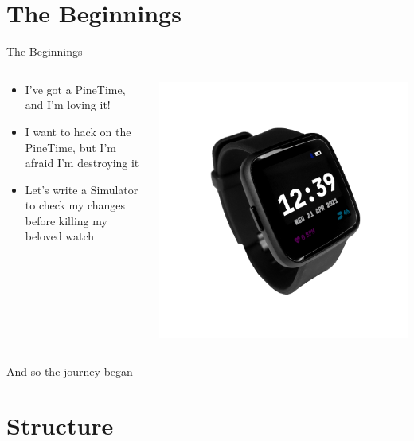 \documentclass{beamer}
\begin{document}
\section{The Beginnings}
\begin{frame}{The Beginnings}
  \begin{columns}
  \begin{column}{0.6\textwidth}
    \begin{itemize}
      \item I've got a PineTime, and I'm loving it!
      \item I want to hack on the PineTime, but I'm afraid I'm destroying it
      \item Let's write a Simulator to check my changes before killing my beloved watch
    \end{itemize}
  \end{column}
  \begin{column}{0.5\textwidth}
    \includegraphics[width=\textwidth]{../pinetime-slider-v2}
  \end{column}
  \end{columns}

  And so the journey began
\end{frame}

\section{Structure}
\end{document}
